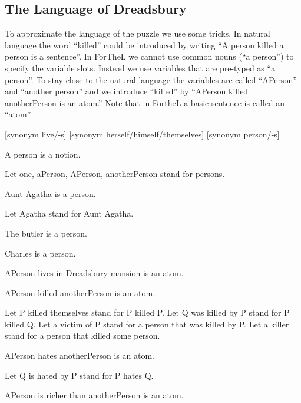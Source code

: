 \documentclass{article}
\begin{document}
\subsection{The Language of Dreadsbury}

To approximate the language of the puzzle we use some tricks.
In natural language the word ``killed'' could be introduced by writing
``A person killed a person is a sentence''. In ForTheL we cannot use
common nouns (``a person'') to specify the variable slots. Instead
we use variables that are pre-typed as ``a person''. To stay close
to the natural language the variables are called ``APerson'' and
``another person'' and we introduce ``killed'' by
``APerson killed anotherPerson is an atom.''
Note that in FortheL a basic sentence is called an ``atom''. \\

\begin{forthel}

[synonym live/-s]
[synonym herself/himself/themselves]
[synonym person/-s]

\begin{signature}
A person is a notion.
\end{signature}

Let one, aPerson, APerson, anotherPerson  stand for persons.

\begin{signature}
Aunt Agatha is a person.
\end{signature}

Let Agatha stand for Aunt Agatha.

\begin{signature}
The butler is a person.
\end{signature}

\begin{signature}
Charles is a person.
\end{signature}

\begin{signature}
APerson lives in Dreadsbury mansion is an atom.
\end{signature}

\begin{signature}
APerson killed anotherPerson is an atom.
\end{signature}

Let P killed themselves stand for P killed P.
Let Q was killed by P stand for P killed Q.
Let a victim of P stand for a person that was killed by P.
Let a killer stand for a person that killed some person.

\begin{signature}
APerson hates anotherPerson is an atom.
\end{signature}

Let Q is hated by P stand for P hates Q.

\begin{signature}
APerson is richer than anotherPerson is an atom.
\end{signature}

\end{forthel}
\end{document}
